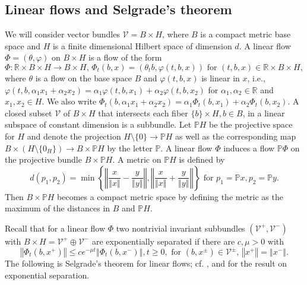 	\subsection{Linear flows and Selgrade's theorem\label{Subsection2.2}}
	
	We will consider vector bundles $\mathcal{V}=B\times H$, where $B$ is a
	compact metric base space and $H$ is a finite dimensional Hilbert space of
	dimension $d$. A linear flow $\Phi=(\theta,\varphi)$ on $B\times H$ is a flow
	of the form
	\[
	\Phi:\mathbb{R}\times B\times H\rightarrow B\times H,\,\Phi_{t}(b,x)=(\theta
	_{t}b,\varphi(t,b,x))\mbox{ for }(t,b,x)\in\mathbb{R}\times B\times H,
	\]
	where $\theta$ is a flow on the base space $B$ and $\varphi(t,b,x)$ is linear
	in $x$, i.e., $\varphi(t,b,\alpha_{1}x_{1}+\alpha_{2}x_{2})=\alpha_{1}%
	\varphi(t,b,x_{1})+\alpha_{2}\varphi(t,b,x_{2})$ for $\alpha_{1},\alpha_{2}%
	\in\mathbb{R}$ and $x_{1},x_{2}\in H$. We also write $\Phi_{t}(b,\alpha
	_{1}x_{1}+\alpha_{2}x_{2})=\alpha_{1}\Phi_{t}(b,x_{1})+\alpha_{2}\Phi
	_{t}(b,x_{2})$. A closed subset $\mathcal{V}$ of $B\times H$ that intersects
	each fiber $\{b\}\times H,b\in B$, in a linear subspace of constant dimension
	is a subbundle. Let $\mathbb{P}H$ be the projective space for $H$ and denote
	the projection $H\setminus\{0\}\rightarrow\mathbb{P}H$ as well as the
	corresponding map $B\times(H\setminus\{0_{H}\})\rightarrow B\times\mathbb{P}H$
	by the letter $\mathbb{P}$. A linear flow $\Phi$ induces a flow $\mathbb{P}%
	\Phi$ on the projective bundle $B\times\mathbb{P}H$. A metric on $\mathbb{P}H$
	is defined by
	\begin{equation}
		d(p_{1},p_{2})=\min\left\{  \left\Vert \frac{x}{\left\Vert x\right\Vert
		}-\frac{y}{\left\Vert y\right\Vert }\right\Vert ,\left\Vert \frac
		{x}{\left\Vert x\right\Vert }+\frac{y}{\left\Vert y\right\Vert }\right\Vert
		\right\}  \mbox{ for }p_{1}=\mathbb{P}x,p_{2}=\mathbb{P}y.\label{metric_P}%
	\end{equation}
	Then $B\times\mathbb{P}H$ becomes a compact metric space by defining the
	metric as the maximum of the distances in $B$ and $\mathbb{P}H$.
	
	Recall that for a linear flow $\Phi$ two nontrivial invariant subbundles
	$(\mathcal{V}^{+},\mathcal{V}^{-})$ with $B\times H=\mathcal{V}^{+}%
	\oplus\mathcal{V}^{-}$ are exponentially separated if there are $c,\mu>0$
	with
	\begin{equation}
		\left\Vert \Phi_{t}(b,x^{+})\right\Vert \leq ce^{-\mu t}\left\Vert \Phi
		_{t}(b,x^{-})\right\Vert ,t\geq0,\mbox{ for }(b,x^{\pm})\in\mathcal{V}^{\pm
		},\,\left\Vert x^{+}\right\Vert =\left\Vert x^{-}\right\Vert . \label{exp_sep}%
	\end{equation}
	The following is Selgrade's theorem for linear flows; cf. \cite[Theorem
	9.2.5]{ColK14}, and \cite[Theorem 5.1.4]{ColK00} for the result on exponential separation.
	
